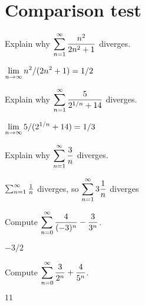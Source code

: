 
\section{Comparison test}
\label{section:comparison-test}



\begin{exercises}

\begin{exercise} Explain why $\displaystyle\sum_{n=1}^\infty {n^2\over 2n^2+1}$
diverges.
\begin{answer} $\displaystyle\lim_{n\to\infty} n^2/(2n^2+1)=1/2$
\end{answer}\end{exercise}

\begin{exercise} Explain why $\displaystyle\sum_{n=1}^\infty {5\over 2^{1/n}+14}$
diverges.
\begin{answer} $\displaystyle\lim_{n\to\infty} 5/(2^{1/n}+14)=1/3$
\end{answer}\end{exercise}

\begin{exercise} Explain why $\displaystyle\sum_{n=1}^\infty {3\over n}$
diverges.
\begin{answer} $\sum_{n=1}^\infty {1\over n}$ diverges, so $\displaystyle\sum_{n=1}^\infty 3{1\over n}$ diverges
\end{answer}\end{exercise}

\twocol

\begin{exercise} Compute $\displaystyle\sum_{n=0}^\infty {4\over (-3)^n}- {3\over 3^n}$. 
\begin{answer} $-3/2$
\end{answer}\end{exercise}

\begin{exercise} Compute $\displaystyle\sum_{n=0}^\infty {3\over 2^n}+ {4\over 5^n}$. 
\begin{answer} $11$
\end{answer}\end{exercise}


\end{exercises}
